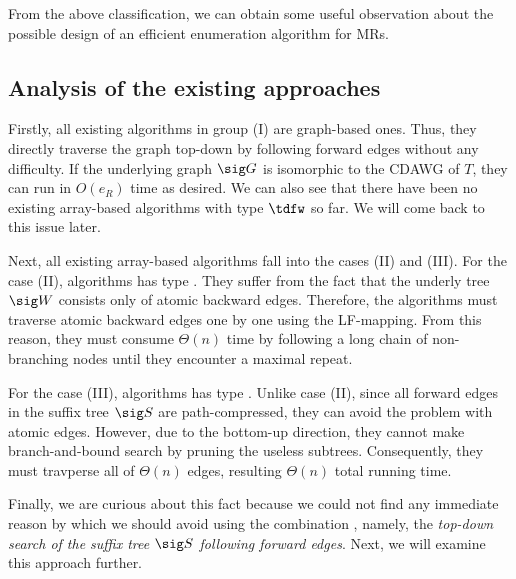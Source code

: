 From the above classification, we can obtain some useful observation about the possible design of an efficient enumeration algorithm for MRs. 

\subsection{Analysis of the existing approaches}
Firstly, all existing algorithms in group (I) are graph-based ones. Thus, they directly traverse the graph top-down by following forward edges without any difficulty. 
If the underlying graph $\sig G$ is isomorphic to the CDAWG of $T$, they can run in $O(e_R)$ time as desired. We can also see that there have been no existing array-based algorithms with type $\tdfw$ so far. We will come back to this issue later. 

Next, all existing array-based algorithms fall into the cases (II) and (III). 
For the case (II), algorithms has type \tdbw. They suffer from the fact that the underly tree $\sig W$ consists only of atomic backward edges. Therefore, the algorithms must traverse atomic backward edges one by one using the LF-mapping. From this reason, they must consume $\Theta(n)$ time by following a long chain of non-branching nodes until they  encounter a maximal repeat. 

For the case (III), algorithms has type \bufw. Unlike case (II), since all forward edges in the suffix tree $\sig S$ are path-compressed, they can avoid the problem with atomic edges. However, due to the bottom-up direction, they cannot make branch-and-bound search by pruning the useless subtrees. Consequently, they must travperse all of $\Theta(n)$ edges, resulting $\Theta(n)$ total running time. 

Finally, we are curious about this fact because we could not find any immediate reason by which we should avoid using the combination {\tdfw}, namely, the \textit{top-down search of the suffix tree $\sig S$ following forward edges}.  
Next, we will examine this approach further. 

